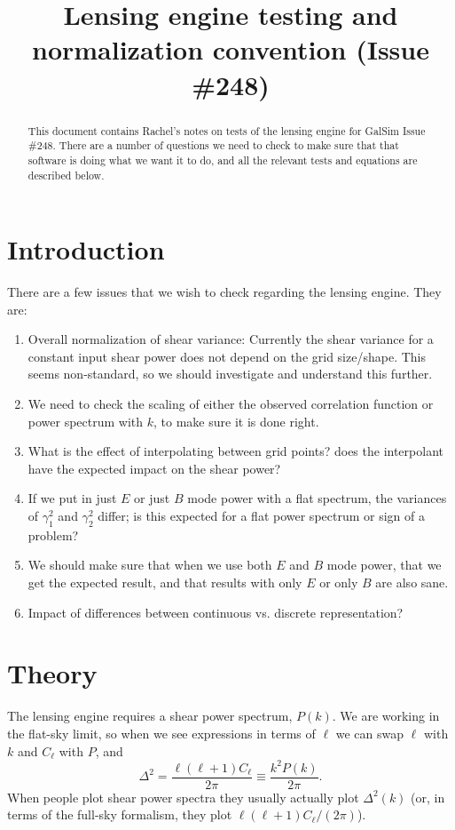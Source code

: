 \documentclass[preprint]{aastex}
\newcommand{\beq}{\begin{equation}}
\newcommand{\eeq}{\end{equation}}
\begin{document}
\title{Lensing engine testing and normalization convention (Issue \#248)}

\begin{abstract}
This document contains Rachel's notes on tests of the lensing engine
for GalSim Issue \#248.  There are a number of questions we need to
check to make sure that that software is doing what we want it to do,
and all the relevant tests and equations are described below.
\end{abstract}

\section{Introduction}

There are a few issues that we wish to check regarding the lensing
engine.  They are:

\begin{enumerate}
\item Overall normalization of shear variance: Currently the shear
  variance for a constant input shear power does not depend on
  the grid size/shape.  This seems non-standard, so we should
  investigate and understand this further.
\item We need to check the scaling of either the observed correlation
  function or power spectrum with $k$, to make sure it is done right.
\item What is the effect of interpolating between grid points?  does
  the interpolant have the expected impact on the shear power?
\item If we put in just $E$ or just $B$ mode power with a flat
  spectrum, the variances of $\gamma_1^2$ and $\gamma_2^2$ differ; is
  this expected for a flat power spectrum or sign of a problem?
\item We should make sure that when we use both $E$ and $B$ mode
  power, that we get the expected result, and that results with only
  $E$ or only $B$ are also sane.
\item Impact of differences between continuous vs. discrete
  representation?
\end{enumerate}

\section{Theory}

The lensing engine requires a shear power spectrum, $P(k)$.  We are
working in the flat-sky limit, so when we see expressions in terms of
$\ell$ we can swap $\ell$ with $k$ and $C_\ell$ with $P$, and
\beq
\Delta^2 = \frac{\ell(\ell+1) C_{\ell}}{2\pi}\equiv \frac{k^2 P(k)}{2\pi}.
\eeq
When people plot shear power spectra they usually actually plot
$\Delta^2(k)$ (or, in terms of the full-sky formalism, they plot $\ell(\ell+1)C_\ell/(2\pi)$).
\end{document}
